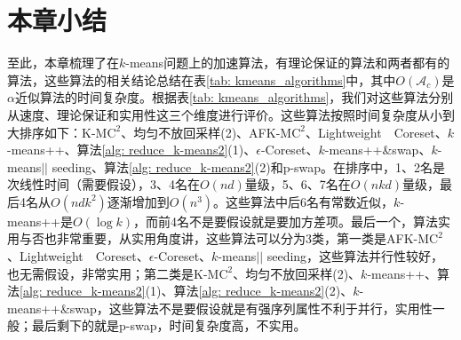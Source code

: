 \section{本章小结}
至此，本章梳理了在$k$-means问题上的加速算法，有理论保证的算法和两者都有的算法，这些算法的相关结论总结在表\ref{tab: kmeans_algorithms}中，其中$O(\mathcal{A}_c)$是$\alpha$近似算法的时间复杂度。根据表\ref{tab: kmeans_algorithms}，我们对这些算法分别从速度、理论保证和实用性这三个维度进行评价。这些算法按照时间复杂度从小到大排序如下：K-M$\text{C}^2$、均匀不放回采样(2)、AFK-M$\text{C}^2$、Lightweight　Coreset、$k$-means++、算法\ref{alg: reduce_k-means2}(1)、$\epsilon$-Coreset、$k$-means++\&swap、$k$-means\(\vert \vert\) seeding、算法\ref{alg: reduce_k-means2}(2)和p-swap。在排序中，1、2名是次线性时间（需要假设），3、4名在$O(nd)$量级，5、6、7名在$O(nkd)$量级，最后4名从$O(ndk^2)$逐渐增加到$O(n^3)$。这些算法中后6名有常数近似，$k$-means++是$O(\log k)$，而前4名不是要假设就是要加方差项。最后一个，算法实用与否也非常重要，从实用角度讲，这些算法可以分为3类，第一类是AFK-M$\text{C}^2$、Lightweight　Coreset、$\epsilon$-Coreset、$k$-means\(\vert \vert\) seeding，这些算法并行性较好，也无需假设，非常实用；第二类是K-M$\text{C}^2$、均匀不放回采样(2)、$k$-means++、算法\ref{alg: reduce_k-means2}(1)、算法\ref{alg: reduce_k-means2}(2)、$k$-means++\&swap，这些算法不是要假设就是有强序列属性不利于并行，实用性一般；最后剩下的就是p-swap，时间复杂度高，不实用。
